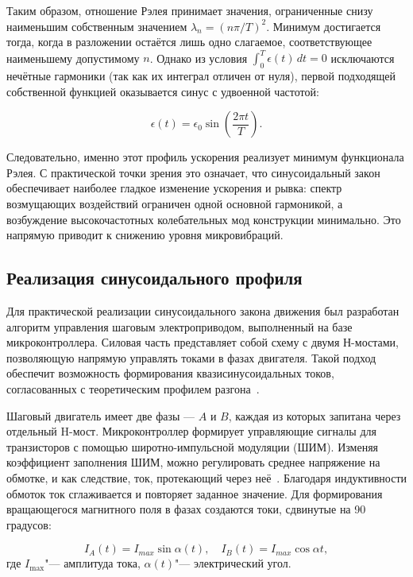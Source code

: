 Таким образом, отношение Рэлея принимает значения, ограниченные снизу наименьшим собственным значением $\lambda_n =(n\pi/T)^2$. Минимум достигается тогда, когда в разложении остаётся лишь одно слагаемое, соответствующее наименьшему допустимому $n$. Однако из условия $\int_{0}^{T} \epsilon(t)\,dt = 0$ исключаются нечётные гармоники (так как их интеграл отличен от нуля), первой подходящей собственной функцией оказывается синус с удвоенной частотой:

\begin{equation}
	\epsilon(t) = \epsilon_0 \sin\left(\frac{2\pi t}{T}\right).
\end{equation}

Следовательно, именно этот профиль ускорения реализует минимум функционала Рэлея. С практической точки зрения это означает, что синусоидальный закон обеспечивает наиболее гладкое изменение ускорения и рывка: спектр возмущающих воздействий ограничен одной основной гармоникой, а возбуждение высокочастотных колебательных мод конструкции минимально. Это напрямую приводит к снижению уровня микровибраций.

\subsection{Реализация синусоидального профиля}

Для практической реализации синусоидального закона движения был разработан алгоритм управления шаговым электроприводом, выполненный на базе микроконтроллера. Силовая часть представляет собой схему с двумя Н-мостами, позволяющую напрямую управлять токами в фазах двигателя. Такой подход обеспечит возможность формирования квазисинусоидальных токов, согласованных с теоретическим профилем разгона~\cite{Athani1997}.

Шаговый двигатель имеет две фазы --- $A$ и $B$, каждая из которых запитана через отдельный H-мост. Микроконтроллер формирует управляющие сигналы для транзисторов с помощью широтно-импульсной модуляции (ШИМ). Изменяя коэффициент заполнения ШИМ, можно регулировать среднее напряжение на обмотке, и как следствие, ток, протекающий через неё~\cite{Virgala2015}. Благодаря индуктивности обмоток ток сглаживается и повторяет заданное значение. Для формирования вращающегося магнитного поля в фазах создаются токи, сдвинутые на 90 градусов: 

\begin{equation}
	\label{eq:current_setpper}
	I_{A}(t) = I_{max} \sin\!\alpha (t), \quad I_{B}(t) = I_{max} \cos \alpha t,
\end{equation}
где \(I_{\max}\)"--- амплитуда тока, \(\alpha(t)\)"--- электрический угол.


